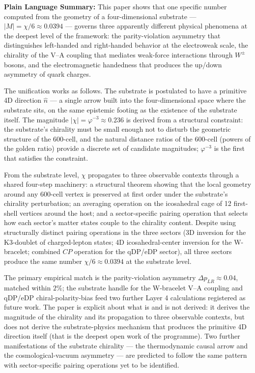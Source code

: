 \documentclass[11pt,letterpaper]{article}
\newcommand{\phig}{\varphi}
\newcommand{\DeltapLR}{\Delta p_{LR}}
\begin{document}
\bigskip\noindent
\textbf{Plain Language Summary:}
This paper shows that one specific number computed from the geometry of a four-dimensional substrate --- $|M| = \chi/6 \approx 0.0394$ --- governs three apparently different physical phenomena at the deepest level of the framework: the parity-violation asymmetry that distinguishes left-handed and right-handed behavior at the electroweak scale, the chirality of the V--A coupling that mediates weak-force interactions through $W^\pm$ bosons, and the electromagnetic handedness that produces the up/down asymmetry of quark charges.

The unification works as follows. The substrate is postulated to have a primitive 4D direction $\hat{n}$ --- a single arrow built into the four-dimensional space where the substrate sits, on the same epistemic footing as the existence of the substrate itself. The magnitude $|\chi| = \phig^{-3} \approx 0.236$ is derived from a structural constraint: the substrate's chirality must be small enough not to disturb the geometric structure of the 600-cell, and the natural distance ratios of the 600-cell (powers of the golden ratio) provide a discrete set of candidate magnitudes; $\phig^{-3}$ is the first that satisfies the constraint.

From the substrate level, $\chi$ propagates to three observable contexts through a shared four-step machinery: a structural theorem showing that the local geometry around any 600-cell vertex is preserved at first order under the substrate's chirality perturbation; an averaging operation on the icosahedral cage of 12 first-shell vertices around the host; and a sector-specific pairing operation that selects how each sector's matter states couple to the chirality content. Despite using structurally distinct pairing operations in the three sectors (3D inversion for the K3-doublet of charged-lepton states; 4D icosahedral-center inversion for the W-bracelet; combined $CP$ operation for the qDP/eDP sector), all three sectors produce the same number $\chi/6 \approx 0.0394$ at the substrate level.

The primary empirical match is the parity-violation asymmetry $\DeltapLR \approx 0.04$, matched within $2\%$; the substrate handle for the W-bracelet V--A coupling and qDP/eDP chiral-polarity-bias feed two further Layer 4 calculations registered as future work. The paper is explicit about what is and is not derived: it derives the magnitude of the chirality and its propagation to three observable contexts, but does not derive the substrate-physics mechanism that produces the primitive 4D direction itself (that is the deepest open work of the programme). Two further manifestations of the substrate chirality --- the thermodynamic causal arrow and the cosmological-vacuum asymmetry --- are predicted to follow the same pattern with sector-specific pairing operations yet to be identified.
\end{document}
